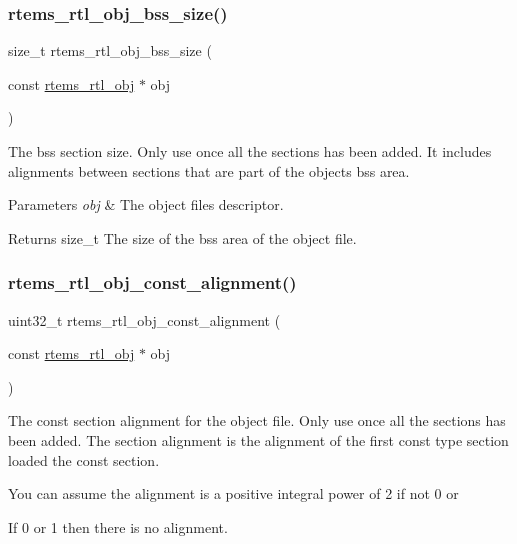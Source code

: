 \subsubsection{\texorpdfstring{rtems\_rtl\_obj\_bss\_size()}{rtems\_rtl\_obj\_bss\_size()}}
{\footnotesize\ttfamily size\+\_\+t rtems\+\_\+rtl\+\_\+obj\+\_\+bss\+\_\+size (\begin{DoxyParamCaption}\item[{const \mbox{\hyperlink{structrtems__rtl__obj}{rtems\+\_\+rtl\+\_\+obj}} $\ast$}]{obj }\end{DoxyParamCaption})}

The bss section size. Only use once all the sections has been added. It includes alignments between sections that are part of the object\textquotesingle{}s bss area.


\begin{DoxyParams}{Parameters}
{\em obj} & The object file\textquotesingle{}s descriptor. \\
\hline
\end{DoxyParams}
\begin{DoxyReturn}{Returns}
size\+\_\+t The size of the bss area of the object file. 
\end{DoxyReturn}
\mbox{\label{rtl-obj_8c_aee3ea1f29f12981579b1d1939bb9907f}} 
\subsubsection{\texorpdfstring{rtems\_rtl\_obj\_const\_alignment()}{rtems\_rtl\_obj\_const\_alignment()}}
{\footnotesize\ttfamily uint32\+\_\+t rtems\+\_\+rtl\+\_\+obj\+\_\+const\+\_\+alignment (\begin{DoxyParamCaption}\item[{const \mbox{\hyperlink{structrtems__rtl__obj}{rtems\+\_\+rtl\+\_\+obj}} $\ast$}]{obj }\end{DoxyParamCaption})}

The const section alignment for the object file. Only use once all the sections has been added. The section alignment is the alignment of the first const type section loaded the const section.

You can assume the alignment is a positive integral power of 2 if not 0 or
\begin{DoxyEnumerate}
\item If 0 or 1 then there is no alignment.
\end{DoxyEnumerate}



